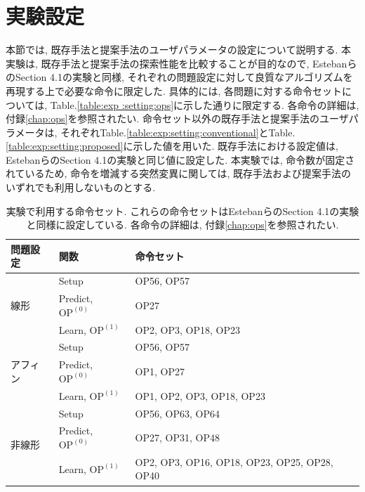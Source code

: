 \documentclass[11pt,oneside,openany,report]{jsbook}
\begin{document}
\section{実験設定}\label{sec:proposed:exp:setting}

本節では, 既存手法と提案手法のユーザパラメータの設定について説明する. 本実験は, 既存手法と提案手法の探索性能を比較することが目的なので, EstebanらのSection 4.1の実験と同様, それぞれの問題設定に対して良質なアルゴリズムを再現する上で必要な命令に限定した\cite{automl_zero}. 具体的には, 各問題に対する命令セットについては, Table.\ref{table:exp
:setting:ops}に示した通りに限定する. 各命令の詳細は, 付録\ref{chap:ops}を参照されたい. 命令セット以外の既存手法と提案手法のユーザパラメータは, それぞれTable.\ref{table:exp:setting:conventional}とTable.\ref{table:exp:setting:proposed}に示した値を用いた. 既存手法における設定値は, EstebanらのSection 4.1の実験と同じ値に設定した\cite{automl_zero}. 本実験では, 命令数が固定されているため, 命令を増減する突然変異に関しては, 既存手法および提案手法のいずれでも利用しないものとする.

\begin{table}[tbp]
  \caption{実験で利用する命令セット. これらの命令セットはEstebanらのSection 4.1の実験と同様に設定している\cite{automl_zero}. 各命令の詳細は, 付録\ref{chap:ops}を参照されたい.}
  \label{table:exp
  :setting:ops}
  \centering
  \begin{tabular}{|l|l|l|}
    \hline
    問題設定 & 関数 & 命令セット \\
    \hline
    \hline
    \multirow{3}{*}{線形}
    & Setup &  OP56, OP57 \\
    & Predict, $\mathrm{OP}^{(0)}$ & OP27  \\
    & Learn, $\mathrm{OP}^{(1)}$ &  OP2, OP3, OP18, OP23 \\
    \hline
    \multirow{3}{*}{アフィン}
    & Setup &  OP56, OP57 \\
    & Predict, $\mathrm{OP}^{(0)}$ & OP1, OP27  \\
    & Learn, $\mathrm{OP}^{(1)}$&  OP1, OP2, OP3, OP18,
    OP23 \\
    \hline
    \multirow{3}{*}{非線形}
    & Setup & OP56, OP63, OP64 \\
    & Predict, $\mathrm{OP}^{(0)}$ & OP27, OP31, OP48 \\
    & Learn, $\mathrm{OP}^{(1)}$& OP2, OP3, OP16, OP18, OP23, OP25, OP28, OP40  \\
    \hline
  \end{tabular}
\end{table}
\end{document}
